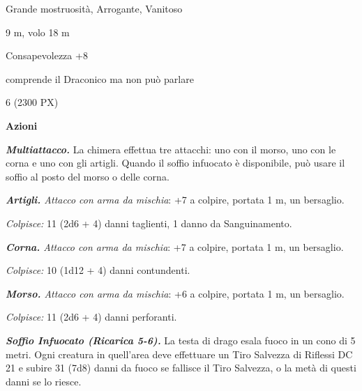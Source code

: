 \begin{multicols}{2}
{
\begin{description}[noitemsep, topsep=0pt, parsep=0pt, partopsep=0pt, itemsep=1pt, leftmargin=2.35cm,  labelwidth=2.2cm, itemindent=0cm, listparindent=0pt] %
\setlength{\baselineskip}{10pt}
\item[\textbf{Taglia/Tipo}] Grande mostruosità, Arrogante, Vanitoso
\item[\textbf{Caratt.}] 
\item[\textbf{Punti Ferita}] 
\item[\textbf{Movimento}] 9 m, volo 18 m
\item[\textbf{Tiri Salvez.}] 
\item[\textbf{Comp.}] Consapevolezza +8
\item[\textbf{Sensi}] 
\item[\textbf{Linguaggi}] comprende il Draconico ma non può parlare
\item[\textbf{Sfida}] 6 (2300 PX)
\end{description}
\smallskip

\textbf{Azioni}

\emph{\textbf{Multiattacco.}} La chimera effettua tre attacchi: uno con il morso, uno con le corna e uno con gli artigli. Quando il soffio infuocato è disponibile, può usare il soffio al posto del morso o delle corna.

\emph{\textbf{Artigli.} Attacco con arma da mischia}: +7 a colpire, portata 1 m, un bersaglio.

\emph{Colpisce:} 11 (2d6 + 4) danni taglienti, 1 danno da Sanguinamento.

\emph{\textbf{Corna.} Attacco con arma da mischia}: +7 a colpire, portata 1 m, un bersaglio.

\emph{Colpisce:} 10 (1d12 + 4) danni contundenti.

\emph{\textbf{Morso.} Attacco con arma da mischia}: +6 a colpire, portata 1 m, un bersaglio.

\emph{Colpisce:} 11 (2d6 + 4) danni perforanti.

\emph{\textbf{Soffio Infuocato (Ricarica 5-6).}} La testa di drago esala fuoco in un cono di 5 metri. Ogni creatura in quell'area deve effettuare un Tiro Salvezza di Riflessi DC 21 e subire 31 (7d8) danni da fuoco se fallisce il Tiro Salvezza, o la metà di questi danni se lo riesce.

}
\end{multicols}
